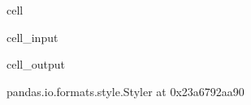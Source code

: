 \documentclass[letterpaper,10pt,english]{jupyterBook}
\begin{document}
\begin{sphinxuseclass}{cell}\begin{sphinxVerbatimInput}

\begin{sphinxuseclass}{cell_input}
\begin{sphinxVerbatim}[commandchars=\\\{\}]
   
  
\end{sphinxVerbatim}

\end{sphinxuseclass}\end{sphinxVerbatimInput}
\begin{sphinxVerbatimOutput}

\begin{sphinxuseclass}{cell_output}
\begin{sphinxVerbatim}[commandchars=\\\{\}]
\PYGZlt{}pandas.io.formats.style.Styler at 0x23a6792aa90\PYGZgt{}
\end{sphinxVerbatim}

\end{sphinxuseclass}\end{sphinxVerbatimOutput}

\end{sphinxuseclass}
\end{document}
